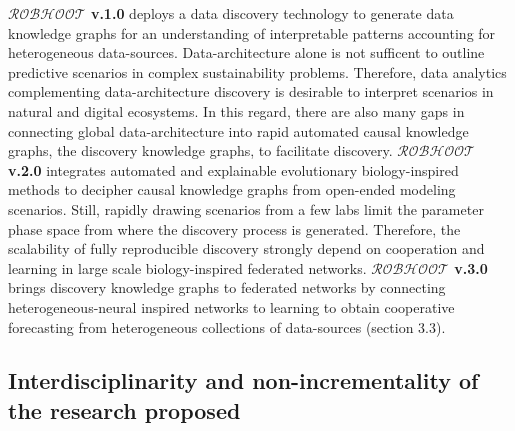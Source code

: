 \documentclass[11pt, a4paper]{article} %
\begin{document}
{\bf $\mathcal{ROBHOOT}$ v.1.0} deploys a data discovery technology to
generate data knowledge graphs for an understanding of interpretable
patterns accounting for heterogeneous data-sources. Data-architecture
alone is not sufficent to outline predictive scenarios in complex
sustainability problems. Therefore, data analytics complementing
data-architecture discovery is desirable to interpret scenarios in
natural and digital ecosystems. In this regard, there are also many
gaps in connecting global data-architecture into rapid automated
causal knowledge graphs, the discovery knowledge graphs, to facilitate
discovery. {\bf $\mathcal{ROBHOOT}$ v.2.0} integrates automated and
explainable evolutionary biology-inspired methods to decipher causal
knowledge graphs from open-ended modeling scenarios. Still, rapidly
drawing scenarios from a few labs limit the parameter phase space from
where the discovery process is generated. Therefore, the scalability
of fully reproducible discovery strongly depend on cooperation and
learning in large scale biology-inspired federated networks. {\bf
  $\mathcal{ROBHOOT}$ v.3.0} brings discovery knowledge graphs to
federated networks by connecting heterogeneous-neural inspired
networks to learning to obtain cooperative forecasting from
heterogeneous collections of data-sources (section 3.3).

\subsection{Interdisciplinarity and non-incrementality of the research
  proposed}
\end{document}
